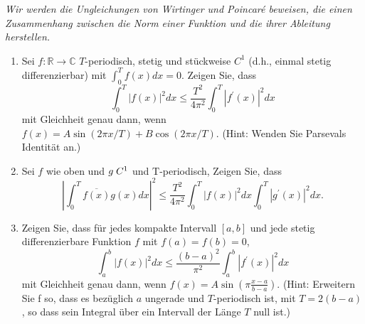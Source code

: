 \documentclass[11pt]{article}
\newenvironment{problem}[2][Beispiel]{
    \begin{trivlist}
        \item[\hskip \labelsep {\bfseries #1}\hskip \labelsep {\bfseries #2.}] \itshape}{
    \end{trivlist}\normalshape
}
\begin{document}
    \begin{problem}{4}
        Wir werden die Ungleichungen von Wirtinger und Poincaré beweisen, die einen Zusammenhang
        zwischen die Norm einer Funktion und die ihrer Ableitung herstellen.
        \begin{enumerate}[label = (\alph*)]
            \item Sei $f: \mathbb{R} \rightarrow \mathbb{C}$ $T$-periodisch, stetig
            und stückweise $C^1$ (d.h., einmal stetig differenzierbar) mit $\int_0^T f(x) d x=0$.
            Zeigen Sie, dass
            $$
            \int_0^T|f(x)|^2 d x \leq \frac{T^2}{4 \pi^2} \int_0^T\left|f^{\prime}(x)\right|^2 d x
            $$
            mit Gleichheit genau dann, wenn $f(x)=A \sin (2 \pi x / T)+B \cos (2 \pi x / T)$.
            (Hint: Wenden Sie Parsevals Identität an.)
            \item Sei $f$ wie oben und $g \thickspace C^1$ und $\mathrm{T}$-periodisch, Zeigen Sie, dass
            $$
            \left|\int_0^T \overline{f(x)} g(x) d x\right|^2 \leq \frac{T^2}{4 \pi^2} \int_0^T
            |f(x)|^2 d x \int_0^T\left|g^{\prime}(x)\right|^2 d x .
            $$
            \item  Zeigen Sie, dass für jedes kompakte Intervall $[a, b]$ und jede stetig
            differenzierbare Funktion $f$ mit $f(a)=f(b)=0$,
            $$
            \int_a^b|f(x)|^2 d x \leq \frac{(b-a)^2}{\pi^2} \int_a^b\left|f^{\prime}(x)\right|^2 d x
            $$
            mit Gleichheit genau dann, wenn $f(x)=A \sin \left(\pi \frac{x-a}{b-a}\right)$.
            (Hint: Erweitern Sie f so, dass es bezüglich $a$ ungerade und $T$-periodisch
            ist, mit $T=2(b-a)$, so dass sein Integral über ein Intervall der Länge $T$ null ist.)
        \end{enumerate}
    \end{problem}
\end{document}
